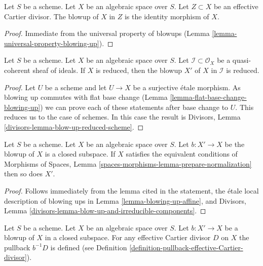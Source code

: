 \begin{lemma}
\label{lemma-blow-up-effective-Cartier-divisor}
Let $S$ be a scheme. Let $X$ be an algebraic space over $S$.
Let $Z \subset X$ be an effective Cartier divisor.
The blowup of $X$ in $Z$ is the identity morphism of $X$.
\end{lemma}

\begin{proof}
Immediate from the universal property of blowups
(Lemma \ref{lemma-universal-property-blowing-up}).
\end{proof}

\begin{lemma}
\label{lemma-blow-up-reduced-space}
Let $S$ be a scheme. Let $X$ be an algebraic space over $S$.
Let $\mathcal{I} \subset \mathcal{O}_X$ be a
quasi-coherent sheaf of ideals. If $X$ is reduced, then the
blowup $X'$ of $X$ in $\mathcal{I}$ is reduced.
\end{lemma}

\begin{proof}
Let $U$ be a scheme and let $U \to X$ be a surjective \'etale morphism.
As blowing up commutes with flat base change
(Lemma \ref{lemma-flat-base-change-blowing-up})
we can prove each of these statements after base change to $U$.
This reduces us to the case of schemes.
In this case the result is
Divisors, Lemma \ref{divisors-lemma-blow-up-reduced-scheme}.
\end{proof}

\begin{lemma}
\label{lemma-blowup-finite-nr-irreducibles}
Let $S$ be a scheme. Let $X$ be an algebraic space over $S$. Let
$b : X' \to X$ be the blowup of $X$ is a closed subspace. If
$X$ satisfies the equivalent conditions of
Morphisms of Spaces, Lemma \ref{spaces-morphisms-lemma-prepare-normalization}
then so does $X'$.
\end{lemma}

\begin{proof}
Follows immediately from the lemma cited in the statement,
the \'etale local description of blowing ups in
Lemma \ref{lemma-blowing-up-affine}, and
Divisors, Lemma \ref{divisors-lemma-blow-up-and-irreducible-components}.
\end{proof}

\begin{lemma}
\label{lemma-blow-up-pullback-effective-Cartier}
Let $S$ be a scheme. Let $X$ be an algebraic space over $S$.
Let $b : X' \to X$ be a blowup of $X$ in a closed subspace.
For any effective Cartier divisor $D$ on $X$ the pullback
$b^{-1}D$ is defined (see Definition
\ref{definition-pullback-effective-Cartier-divisor}).
\end{lemma}

